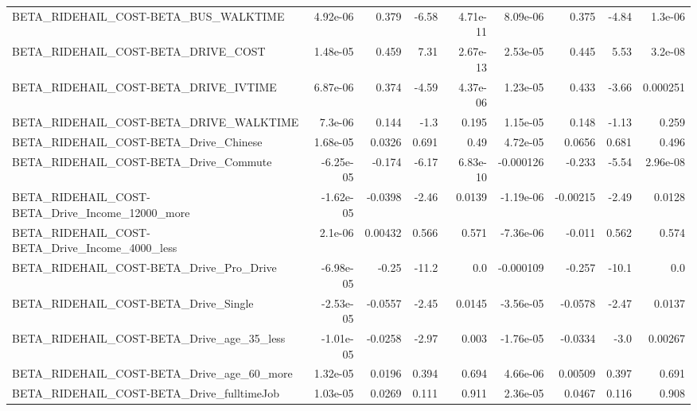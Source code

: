 \begin{tabular}{lrrrrrrrr}
BETA\_RIDEHAIL\_COST-BETA\_BUS\_WALKTIME               &    4.92e-06 &        0.379 &     -6.58 & 4.71e-11 &   8.09e-06 &       0.375 &        -4.84 &       1.3e-06 \\
BETA\_RIDEHAIL\_COST-BETA\_DRIVE\_COST                 &    1.48e-05 &        0.459 &      7.31 & 2.67e-13 &   2.53e-05 &       0.445 &         5.53 &       3.2e-08 \\
BETA\_RIDEHAIL\_COST-BETA\_DRIVE\_IVTIME               &    6.87e-06 &        0.374 &     -4.59 & 4.37e-06 &   1.23e-05 &       0.433 &        -3.66 &      0.000251 \\
BETA\_RIDEHAIL\_COST-BETA\_DRIVE\_WALKTIME             &     7.3e-06 &        0.144 &      -1.3 &    0.195 &   1.15e-05 &       0.148 &        -1.13 &         0.259 \\
BETA\_RIDEHAIL\_COST-BETA\_Drive\_Chinese              &    1.68e-05 &       0.0326 &     0.691 &     0.49 &   4.72e-05 &      0.0656 &        0.681 &         0.496 \\
BETA\_RIDEHAIL\_COST-BETA\_Drive\_Commute              &   -6.25e-05 &       -0.174 &     -6.17 & 6.83e-10 &  -0.000126 &      -0.233 &        -5.54 &      2.96e-08 \\
BETA\_RIDEHAIL\_COST-BETA\_Drive\_Income\_12000\_more    &   -1.62e-05 &      -0.0398 &     -2.46 &   0.0139 &  -1.19e-06 &    -0.00215 &        -2.49 &        0.0128 \\
BETA\_RIDEHAIL\_COST-BETA\_Drive\_Income\_4000\_less     &     2.1e-06 &      0.00432 &     0.566 &    0.571 &  -7.36e-06 &      -0.011 &        0.562 &         0.574 \\
BETA\_RIDEHAIL\_COST-BETA\_Drive\_Pro\_Drive            &   -6.98e-05 &        -0.25 &     -11.2 &      0.0 &  -0.000109 &      -0.257 &        -10.1 &           0.0 \\
BETA\_RIDEHAIL\_COST-BETA\_Drive\_Single               &   -2.53e-05 &      -0.0557 &     -2.45 &   0.0145 &  -3.56e-05 &     -0.0578 &        -2.47 &        0.0137 \\
BETA\_RIDEHAIL\_COST-BETA\_Drive\_age\_35\_less          &   -1.01e-05 &      -0.0258 &     -2.97 &    0.003 &  -1.76e-05 &     -0.0334 &         -3.0 &       0.00267 \\
BETA\_RIDEHAIL\_COST-BETA\_Drive\_age\_60\_more          &    1.32e-05 &       0.0196 &     0.394 &    0.694 &   4.66e-06 &     0.00509 &        0.397 &         0.691 \\
BETA\_RIDEHAIL\_COST-BETA\_Drive\_fulltimeJob          &    1.03e-05 &       0.0269 &     0.111 &    0.911 &   2.36e-05 &      0.0467 &        0.116 &         0.908 \\

\end{tabular}
